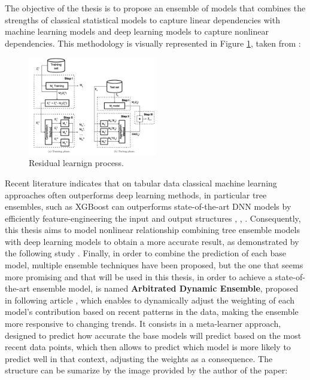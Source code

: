 The objective of the thesis is to propose an ensemble of models that combines the strengths of classical statistical models to capture linear dependencies with machine learning models and deep learning models to capture nonlinear dependencies. This methodology is visually represented in Figure \ref{fig: Residual learning}, taken from \cite{SANTOSJUNIOR2023119614}:
\begin{figure}[H]
    \centering
    \includegraphics[width=0.50\textwidth]{Machine_learning_thesis/Images/residual learning.png}
    \caption{Residual learnign process.} 
    \label{fig: Residual learning}
\end{figure} 
Recent literature indicates that on tabular data classical machine learning approaches often outperforms deep learning methods, in particular tree ensembles, such as XGBoost can outperforms state-of-the-art DNN models by efficiently feature-engineering the input and output structures \cite{elsayed2021do}, \cite{grinsztajn2022why}, \cite{shwartz2022tabular}. Consequently, this thesis aims to model nonlinear relationship combining tree ensemble models with deep learning models to obtain a more accurate result, as demonstrated by the following study \cite {shwartz2022tabular}. Finally, in order to combine the prediction of each base model, multiple ensemble techniques have been proposed, but the one that seems more promising and that will be used in this thesis, in order to achieve a state-of-the-art ensemble model, is named \textbf{Arbitrated Dynamic Ensemble}, proposed in following article \cite{castro2023arbitrated}, which enables to dynamically adjust the weighting of each model’s contribution based on recent patterns in the data, making the ensemble more responsive to changing trends. It consists in a meta-learner approach, designed to predict how accurate the base models will predict based on the most recent data points, which then allows to predict which model is more likely to predict well in that context, adjusting the weights as a consequence. The structure can be sumarize by the image provided by the author of the paper: 
